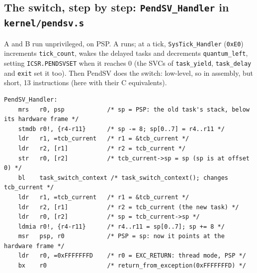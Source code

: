 \subsection{The switch, step by step: \texttt{PendSV\_Handler} in \texttt{kernel/pendsv.s}}
A and B run unprivileged, on PSP. A runs; at a tick, \texttt{SysTick\_Handler} (\texttt{0xE0}) increments \texttt{tick\_count}, wakes the delayed tasks and decrements \texttt{quantum\_left}, setting \texttt{ICSR.PENDSVSET} when it reaches 0 (the SVCs of \texttt{task\_yield}, \texttt{task\_delay} and \texttt{exit} set it too). Then PendSV does the switch: low-level, so in assembly, but short, 13 instructions (here with their C equivalents).
\begin{lstlisting}
PendSV_Handler:
    mrs   r0, psp            /* sp = PSP: the old task's stack, below its hardware frame */
    stmdb r0!, {r4-r11}      /* sp -= 8; sp[0..7] = r4..r11 */
    ldr   r1, =tcb_current   /* r1 = &tcb_current */
    ldr   r2, [r1]           /* r2 = tcb_current */
    str   r0, [r2]           /* tcb_current->sp = sp (sp is at offset 0) */
    bl    task_switch_context /* task_switch_context(); changes tcb_current */
    ldr   r1, =tcb_current   /* r1 = &tcb_current */
    ldr   r2, [r1]           /* r2 = tcb_current (the new task) */
    ldr   r0, [r2]           /* sp = tcb_current->sp */
    ldmia r0!, {r4-r11}      /* r4..r11 = sp[0..7]; sp += 8 */
    msr   psp, r0            /* PSP = sp: now it points at the hardware frame */
    ldr   r0, =0xFFFFFFFD    /* r0 = EXC_RETURN: thread mode, PSP */
    bx    r0                 /* return_from_exception(0xFFFFFFFD) */
\end{lstlisting}

